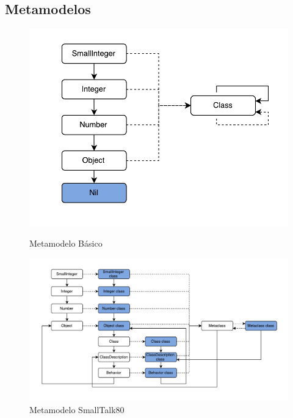 \subsection{Metamodelos}

\begin{figure}[H]
\centering
\begin{minipage}{.4\textwidth}
  \centering
  \includegraphics[width=\linewidth]{images/metamodelo_smalltalk_basico.pdf}
  \caption{Metamodelo B\'asico}
  \label{fig:metamodelo_basico}
\end{minipage}%
\begin{minipage}{.6\textwidth}
  \centering
  \includegraphics[width=1.2\linewidth]{images/metamodelo_smalltalk_80.pdf}
  \caption{Metamodelo SmallTalk80}
  \label{fig:metamodelo_st80}
\end{minipage}
\label{fig:test}
\end{figure}

